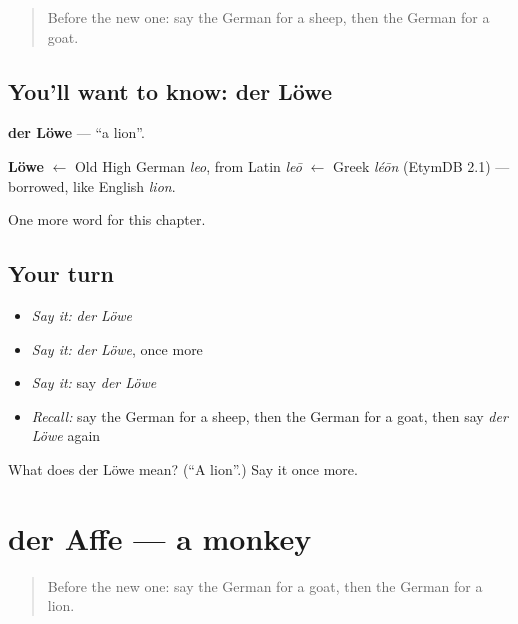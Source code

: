 \label{lesson:GE-C87-loewe}



\begin{quote}
Before the new one: say the German for a sheep, then the German for a goat.
\end{quote}

\subsection*{You'll want to know: der Löwe}
\textbf{der Löwe} — \textquotedblleft{}a lion\textquotedblright{}.

\begin{cousinweb}
\textbf{Löwe} $\leftarrow$ Old High German \emph{leo}, from Latin \emph{leō} $\leftarrow$ Greek \emph{léōn} (EtymDB 2.1) — borrowed, like English \emph{lion}.
\end{cousinweb}

\begin{grammarlens}[title={What you've built}]
One more word for this chapter.
\end{grammarlens}

\subsection*{Your turn}
\begin{itemize}
\raggedright
  \item \emph{Say it:} \emph{der Löwe}
  \item \emph{Say it:} \emph{der Löwe}, once more
  \item \emph{Say it:} say \emph{der Löwe}
  \item \emph{Recall:} say the German for a sheep, then the German for a goat, then say \emph{der Löwe} again
\end{itemize}

\begin{tcolorbox}[breakable,colback=teal!4,colframe=teal!35!black,title={Before you move on}]
What does der Löwe mean? (\textquotedblleft{}A lion\textquotedblright{}.) Say it once more.
\end{tcolorbox}
\section[der Affe]{der Affe — a monkey}

\label{lesson:GE-C87-affe}



\begin{quote}
Before the new one: say the German for a goat, then the German for a lion.
\end{quote}

